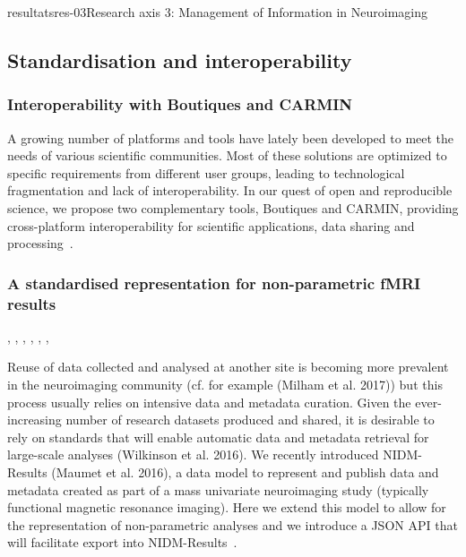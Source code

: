 \documentclass{ra2018}
\begin{document}
\begin{module}{resultats}{res-03}{Research axis 3: Management of Information in Neuroimaging}
\subsection{Standardisation and interoperability}
\subsubsection{Interoperability with Boutiques and CARMIN}
\begin{participants}
\end{participants}
A growing number of platforms and tools have lately been developed to meet the needs of various scientific communities. Most of these solutions are optimized to specific requirements from different user groups, leading to technological fragmentation and lack of interoperability. In our quest of open and reproducible science, we propose two complementary tools, Boutiques and CARMIN, providing cross-platform interoperability for scientific applications, data sharing and processing~\cite{pop:inserm-01846997}.

\subsubsection{A standardised representation for non-parametric fMRI results}
\begin{participants}
      ,
      ,
      ,
      ,
      ,
      ,
\end{participants}
Reuse of data collected and analysed at another site is becoming more prevalent in the neuroimaging community (cf. for example (Milham et al. 2017)) but this process usually relies on intensive data and metadata curation. Given the ever-increasing number of research datasets produced and shared, it is desirable to rely on standards that will enable automatic data and metadata retrieval for large-scale analyses (Wilkinson et al. 2016). We recently introduced NIDM-Results (Maumet et al. 2016), a data model to represent and publish data and metadata created as part of a mass univariate neuroimaging study (typically functional magnetic resonance imaging). Here we extend this model to allow for the representation of non-parametric analyses and we introduce a JSON API that will facilitate export into NIDM-Results~\cite{maumet:inserm-01828914}.


\end{module}
\end{document}
